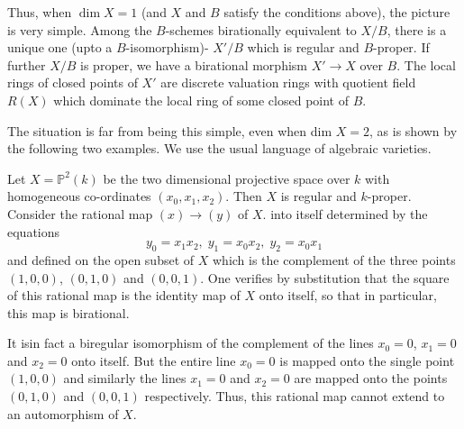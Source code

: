 Thus, when $\dim X=1$ (and $X$ and $B$ satisfy the conditions  above),
the picture is very simple. Among the $B$-schemes birationally equivalent
to $X/B$, there is a unique one (upto a $B$-isomorphism)- $X'/B$ which is
regular and $B$-proper. If further $X/B$ is proper, we have a birational
morphism $X' \rightarrow X$ over $B$. The local rings of closed points
of $X'$ are discrete valuation rings with quotient field $R(X)$
which dominate the local ring of some closed point of $B$. 

The situation is far from being this simple, even when dim $X=2$, as
is shown by the following two examples. We use the usual language of
algebraic varieties. 

\begin{exam}\label{chap1:exam1}%
  Let $X = \mathbb{P}^2 (k)$ be the two dimensional projective space
  over $k$  with homogeneous co-ordinates $(x_0, x_1, x_2)$. Then $X$
  is regular and $k$-proper. Consider the rational map $(x) \rightarrow
  (y)$ of $X$. into itself determined by the equations 
  $$
  y_0 = x_1 x_2, \; y_1 = x_0 x_2, \; y_2 = x_0 x_1
  $$
  and defined on the open subset of $X$ which is the complement of the
  three points $(1,0,0)$, $(0,1,0)$ and $(0,0,1)$. One verifies by
  substitution that the square of this rational map is the identity
  map of $X$ onto itself, so that in particular, this map is
  birational. 

It is\pageoriginale in fact a biregular isomorphism of the complement
of the lines $x_0 = 0$, $x_1 = 0$ and $x_2 = 0$ onto itself. But the
entire line $x_0 = 0$ is mapped onto the single point $(1,0,0)$ and
similarly the lines $x_1 = 0$ and $x_2 = 0$ are mapped onto the points
$(0,1,0)$ and $(0,0,1)$ respectively. Thus, this rational map cannot
extend to an automorphism of $X$.   
\end{exam}

